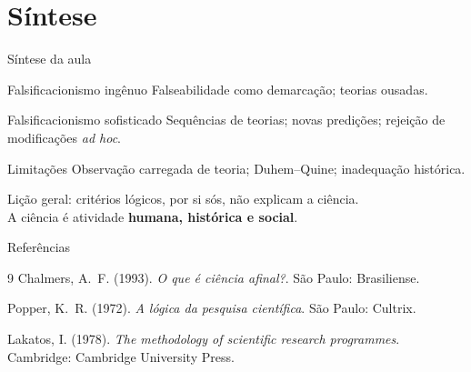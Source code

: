\documentclass[aspectratio=169]{beamer}
\newcommand{\impt}[1]{\textcolor{maccent}{\textbf{#1}}}
\newcommand{\ntc}[1]{\textcolor{mprimary}{#1}}
\begin{document}
\section{Síntese}

\begin{frame}{Síntese da aula}
\begin{block}{Falsificacionismo ingênuo}
Falseabilidade como demarcação; teorias ousadas.
\end{block}
\pause
\vspace{0.2cm}
\begin{block}{Falsificacionismo sofisticado}
Sequências de teorias; novas predições; rejeição de modificações \emph{ad hoc}.
\end{block}
\pause
\vspace{0.2cm}
\begin{alertblock}{Limitações}
Observação carregada de teoria; Duhem--Quine; inadequação histórica.
\end{alertblock}
\pause
\vspace{0.4cm}
\ntc{Lição geral:} critérios lógicos, por si sós, não explicam a ciência. \\
A ciência é atividade \impt{humana, histórica e social}.
\end{frame}

\begin{frame}[allowframebreaks]{Referências}
\small
\begin{thebibliography}{9}
Chalmers, A.\ F. (1993).
\newblock \emph{O que é ciência afinal?}.
\newblock São Paulo: Brasiliense.

Popper, K.\ R. (1972).
\newblock \emph{A lógica da pesquisa científica}.
\newblock São Paulo: Cultrix.

Lakatos, I. (1978).
\newblock \emph{The methodology of scientific research programmes}.
\newblock Cambridge: Cambridge University Press.
\end{thebibliography}
\end{frame}
\end{document}
